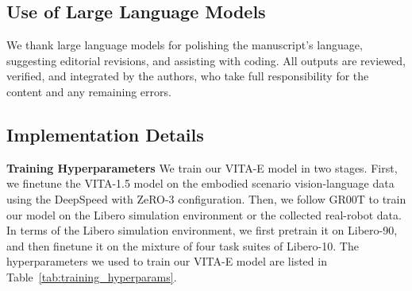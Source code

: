 \subsection{Use of Large Language Models}

We thank large language models for polishing the manuscript’s language, suggesting editorial revisions, and assisting with coding. All outputs are reviewed, verified, and integrated by the authors, who take full responsibility for the content and any remaining errors.

\subsection{Implementation Details}

\textbf{Training Hyperparameters}
We train our VITA-E model in two stages.
First, we finetune the VITA-1.5 model on the embodied scenario vision-language data using the DeepSpeed with ZeRO-3 configuration.
Then, we follow GR00T to train our model on the Libero simulation environment or the collected real-robot data.
In terms of the Libero simulation environment, we first pretrain it on Libero-90, and then finetune it on the mixture of four task suites of Libero-10.
The hyperparameters we used to train our VITA-E model are listed in Table~\ref{tab:training_hyperparams}.

\begin{table}[H]
\centering
\caption{VITA-E training hyperparameters.}
\end{table}

